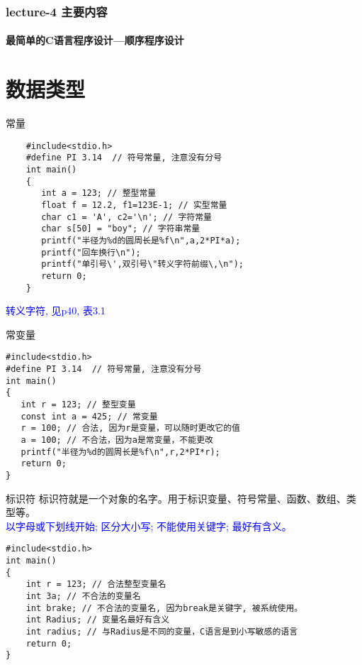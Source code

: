 \begin{frame}
  \frametitle{lecture-4 主要内容}
  \framesubtitle{最简单的C语言程序设计---顺序程序设计}
  \tableofcontents[hideallsubsections]
\end{frame}

\section{数据类型}

\begin{frame}{常量}
    \begin{lstlisting}
    #include<stdio.h> 
    #define PI 3.14  // 符号常量, 注意没有分号           
    int main()                   
    {                                  
       int a = 123; // 整型常量
       float f = 12.2, f1=123E-1; // 实型常量
       char c1 = 'A', c2='\n'; // 字符常量
       char s[50] = "boy"; // 字符串常量
       printf("半径为%d的圆周长是%f\n",a,2*PI*a);       
       printf("回车换行\n");
       printf("单引号\',双引号\"转义字符前缀\,\n");  
       return 0;           
    }                            
    \end{lstlisting}
    \textcolor{blue}{转义字符, 见p40, 表3.1}
\end{frame}

\begin{frame}[fragile]{常变量}
\begin{lstlisting}
#include<stdio.h> 
#define PI 3.14  // 符号常量, 注意没有分号           
int main()                   
{                            
   int r = 123; // 整型变量
   const int a = 425; // 常变量
   r = 100; // 合法, 因为r是变量，可以随时更改它的值
   a = 100; // 不合法，因为a是常变量，不能更改
   printf("半径为%d的圆周长是%f\n",r,2*PI*r); 
   return 0;           
}                            
\end{lstlisting}
\end{frame}

\begin{frame}[fragile]{标识符}
标识符就是一个对象的名字。用于标识变量、符号常量、函数、数组、类型等。\\
\textcolor{blue}{以字母或下划线开始; 区分大小写; 不能使用关键字; 最好有含义。}
\begin{lstlisting}
#include<stdio.h>           
int main()                   
{                            
    int r = 123; // 合法整型变量名
    int 3a; // 不合法的变量名
    int brake; // 不合法的变量名, 因为break是关键字, 被系统使用。
    int Radius; // 变量名最好有含义
    int radius; // 与Radius是不同的变量，C语言是到小写敏感的语言
    return 0;           
}                            
\end{lstlisting}
\end{frame}

